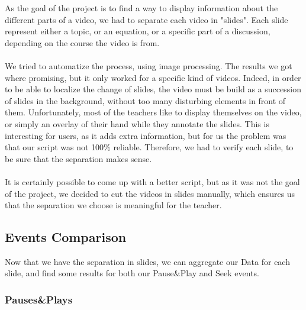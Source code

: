 \documentclass[11pt,a4paper]{article}
\begin{document}
As the goal of the project is to find a way to display information about the different parts of a video, we had to separate each video in "slides". Each slide represent either a topic, or an equation, or a specific part of a discussion, depending on the course the video is from. \\
\\
We tried to automatize the process, using image processing. The results we got where promising, but it only worked for a specific kind of videos. Indeed, in order to be able to localize the change of slides, the video must be build as a succession of slides in the background, without too many disturbing elements in front of them. Unfortunately, most of the teachers like to display themselves on the video, or simply an overlay of their hand while they annotate the slides. This is interesting for users, as it adds extra information, but for us the problem was that our script was not 100$\%$ reliable. Therefore, we had to verify each slide, to be sure that the separation makes sense. \\
\\
It is certainly possible to come up with a better script, but as it was not the goal of the project, we decided to cut the videos in slides manually, which ensures us that the separation we choose is meaningful for the teacher. 

\subsection{Events Comparison}

Now that we have the separation in slides, we can aggregate our Data for each slide, and find some results for both our Pause\&Play and Seek events.

\subsubsection{Pauses\&Plays}
\end{document}
